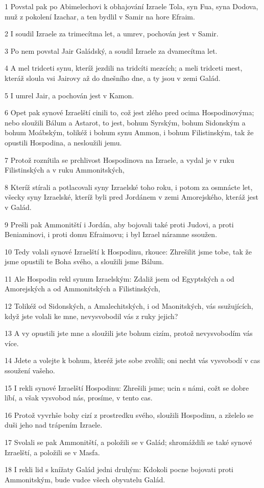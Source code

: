 \par 1 Povstal pak po Abimelechovi k obhajování Izraele Tola, syn Fua, syna Dodova, muž z pokolení Izachar, a ten bydlil v Samir na hore Efraim.
\par 2 I soudil Izraele za trimecítma let, a umrev, pochován jest v Samir.
\par 3 Po nem povstal Jair Galádský, a soudil Izraele za dvamecítma let.
\par 4 A mel tridceti synu, kteríž jezdili na tridcíti mezcích; a meli tridceti mest, kteráž sloula vsi Jairovy až do dnešního dne, a ty jsou v zemi Galád.
\par 5 I umrel Jair, a pochován jest v Kamon.
\par 6 Opet pak synové Izraelští cinili to, což jest zlého pred ocima Hospodinovýma; nebo sloužili Bálum a Astarot, to jest, bohum Syrským, bohum Sidonským a bohum Moábským, tolikéž i bohum synu Ammon, i bohum Filistinským, tak že opustili Hospodina, a nesloužili jemu.
\par 7 Protož roznítila se prchlivost Hospodinova na Izraele, a vydal je v ruku Filistinských a v ruku Ammonitských,
\par 8 Kteríž stírali a potlacovali syny Izraelské toho roku, i potom za osmnácte let, všecky syny Izraelské, kteríž byli pred Jordánem v zemi Amorejského, kteráž jest v Galád.
\par 9 Prešli pak Ammonitští i Jordán, aby bojovali také proti Judovi, a proti Beniaminovi, i proti domu Efraimovu; i byl Izrael náramne ssoužen.
\par 10 Tedy volali synové Izraelští k Hospodinu, rkouce: Zhrešilit jsme tobe, tak že jsme opustili te Boha svého, a sloužili jsme Bálum.
\par 11 Ale Hospodin rekl synum Izraelským: Zdaliž jsem od Egyptských a od Amorejských a od Ammonitských a Filistinských,
\par 12 Tolikéž od Sidonských, a Amalechitských, i od Maonitských, vás ssužujících, když jste volali ke mne, nevysvobodil vás z ruky jejich?
\par 13 A vy opustili jste mne a sloužili jste bohum cizím, protož nevysvobodím vás více.
\par 14 Jdete a volejte k bohum, kteréž jste sobe zvolili; oni necht vás vysvobodí v cas ssoužení vašeho.
\par 15 I rekli synové Izraelští Hospodinu: Zhrešili jsme; ucin s námi, cožt se dobre líbí, a však vysvobod nás, prosíme, v tento cas.
\par 16 Protož vyvrhše bohy cizí z prostredku svého, sloužili Hospodinu, a zželelo se duši jeho nad trápením Izraele.
\par 17 Svolali se pak Ammonitští, a položili se v Galád; shromáždili se také synové Izraelští, a položili se v Masfa.
\par 18 I rekli lid s knížaty Galád jedni druhým: Kdokoli pocne bojovati proti Ammonitským, bude vudce všech obyvatelu Galád.

